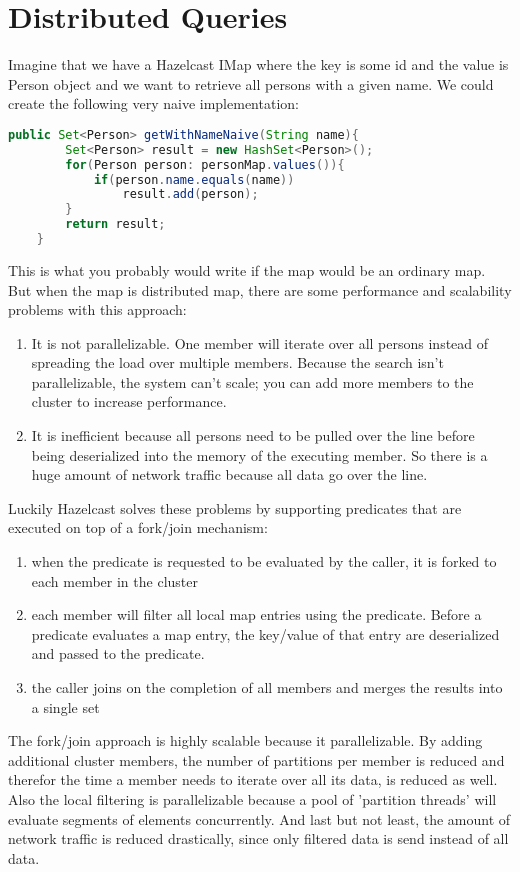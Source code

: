\section{Distributed Queries}
Imagine that we have a Hazelcast IMap where the key is some id and the value is Person object and we want to retrieve all persons with a given name. We could create the following very naive implementation:
\begin{lstlisting}[language=java]
   public Set<Person> getWithNameNaive(String name){
        Set<Person> result = new HashSet<Person>();
        for(Person person: personMap.values()){
            if(person.name.equals(name))
                result.add(person);
        }
        return result;
    }
\end{lstlisting}
This is what you probably would write if the map would be an ordinary map. But when the map is distributed map, there are some performance and scalability problems with this approach:
\begin{enumerate}
\item It is not parallelizable. One member will iterate over all persons instead of spreading the load over multiple members. Because the search isn't parallelizable, the system can't scale; you can add more members to the cluster to increase performance.
\item It is inefficient because all persons need to be pulled over the line before being deserialized into the memory of the executing member. So there is a huge amount of network traffic because all data go over the line.
\end{enumerate}

Luckily Hazelcast solves these problems by supporting predicates that are executed on top of a fork/join mechanism:
\begin{enumerate}
\item when the predicate is requested to be evaluated by the caller, it is forked to each member in the cluster
\item each member will filter all local map entries using the predicate. Before a predicate evaluates a map entry, the key/value of that entry are deserialized and passed to the predicate. 
\item the caller joins on the completion of all members and merges the results into a single set
\end{enumerate}
The fork/join approach is highly scalable because it parallelizable. By adding additional cluster members, the number of partitions per member is reduced and therefor the time a member needs to iterate over all its data, is reduced as well. Also the local filtering is parallelizable because a pool of 'partition threads' will evaluate segments of elements concurrently. And last but not least, the amount of network traffic is reduced drastically, since only filtered data is send instead of all data.

